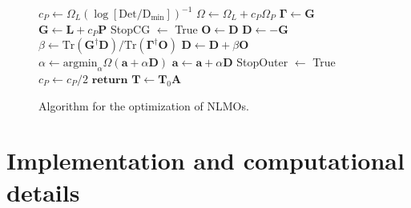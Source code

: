 \documentclass[aps,prl,reprint,amsmath,amssymb]{revtex4-1}
\begin{document}
\begin{figure}
\begin{algorithm}[H]
\begin{algorithmic}[1]
				\State $c_{P} \gets \Omega_{L}(\log [\text{Det} / \text{D}_{\text{min}} ])^{-1}$ 
			\EndIf
			\State $\Omega \gets \Omega_{L} + c_P \Omega_{P} $ 
				\State $\mathbf{\Gamma} \gets \mathbf{G}$ 
			\EndIf 
			\State $\mathbf{G} \gets \mathbf{L} + c_P \mathbf{P} $ 
				\State StopCG $\gets$ True
			\EndIf
					\State $\mathbf{O} \gets \mathbf{D}$ 
				\EndIf
				\State $\mathbf{D} \gets - \mathbf{G}$ 
					\State $\beta \gets \text{Tr}(\mathbf{G}^{\dagger} \mathbf{D})/\text{Tr}(\mathbf{\Gamma}^{\dagger}\mathbf{O})$
					\State $\mathbf{D} \gets \mathbf{D} + \beta \mathbf{O}$ 
				\EndIf 
				\State $\alpha \gets \text{argmin}_{\alpha} \Omega(\mathbf{a} + \alpha \mathbf{D})$ 
				\State $\mathbf{a}\gets \mathbf{a} + \alpha \mathbf{D}$ 
			\EndIf
			\State StopOuter $\gets$ True
		\EndIf
			\State $c_{P} \gets c_P / 2$ 
		\EndIf
	\State $\mathbf{return}$ $\mathbf{T} \gets \mathbf{T}_0 \mathbf{A} $ 
   \end{algorithmic}
\end{algorithm}
\caption{\label{fig:cg} Algorithm for the optimization of NLMOs.}
\end{figure}

\section{Implementation and computational details}
\end{document}
